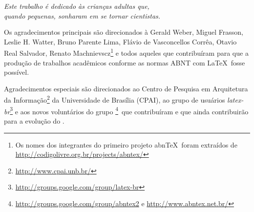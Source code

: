 \documentclass[
	12pt,				%
	openright,			%
	oneside,			%
	a4paper,			%
	chapter=TITLE,		%
	section=TITLE,		%
	sumario=abnt-6027-2012,
	english,			%
	french,				%
	spanish,			%
	brazil				%
	]{abntex2}
\begin{document}
\begin{dedicatoria}
   \vspace*{\fill}
   \centering
   \noindent
   \textit{ Este trabalho é dedicado às crianças adultas que,\\
   quando pequenas, sonharam em se tornar cientistas.} \vspace*{\fill}
\end{dedicatoria}

\begin{agradecimentos}
Os agradecimentos principais são direcionados à Gerald Weber, Miguel Frasson,
Leslie H. Watter, Bruno Parente Lima, Flávio de Vasconcellos Corrêa, Otavio Real
Salvador, Renato Machnievscz\footnote{Os nomes dos integrantes do primeiro
projeto abn\TeX\ foram extraídos de
\url{http://codigolivre.org.br/projects/abntex/}} e todos aqueles que
contribuíram para que a produção de trabalhos acadêmicos conforme
as normas ABNT com \LaTeX\ fosse possível.

Agradecimentos especiais são direcionados ao Centro de Pesquisa em Arquitetura
da Informação\footnote{\url{http://www.cpai.unb.br/}} da Universidade de
Brasília (CPAI), ao grupo de usuários
\emph{latex-br}\footnote{\url{http://groups.google.com/group/latex-br}} e aos
novos voluntários do grupo
\emph{\abnTeX}\footnote{\url{http://groups.google.com/group/abntex2} e
\url{http://www.abntex.net.br/}}~que contribuíram e que ainda
contribuirão para a evolução do \abnTeX.

\end{agradecimentos}
\end{document}
